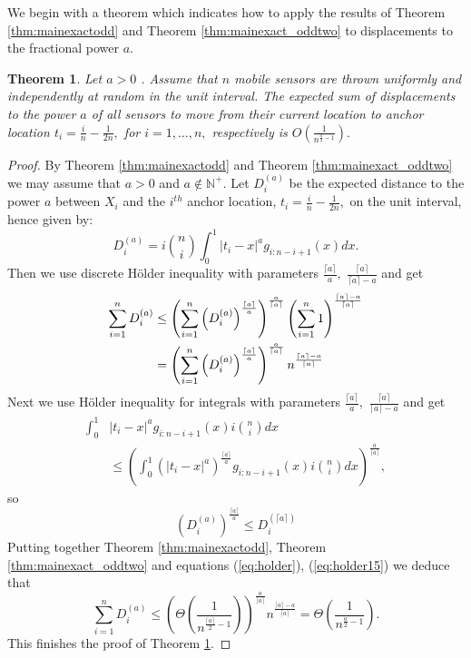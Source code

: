 \documentclass[final,5p,times,twocolumn]{elsarticle_mod}
\newtheorem{theorem}{Theorem}
\begin{document}
We begin with a theorem which indicates how to apply the results of 
Theorem \ref{thm:mainexactodd}  and Theorem \ref{thm:mainexact_oddtwo}
to displacements to the fractional power $a$.
\begin{theorem}
 \label{thm:fractional}
Let $a>0$ . Assume that $n$ mobile sensors are thrown uniformly and independently at random in the unit interval. The expected sum
of displacements to the power $a$ of all sensors to move from their current location to anchor location $t_i=\frac{i}{n}-\frac{1}{2n},$
for $i=1,\dots,n,$ respectively is $O\left(\frac{1}{n^{\frac{a}{2}-1}}\right).$
\end{theorem}
\begin{proof}
By Theorem \ref{thm:mainexactodd} and Theorem \ref{thm:mainexact_oddtwo} we may assume that $a>0$ and $a\notin \mathbb{N}^{+}.$
Let $D^{(a)}_i$ be the expected distance to the power $a$ between $X_i$ and the $i^{th}$ anchor location, $t_i=\frac{i}{n}-\frac{1}{2n},$ on the
unit interval, hence given by:
$$
D^{(a)}_i=i\binom{n}{i}\int_{0}^{1}|t_i-x|^ag_{i:n-i+1}(x)dx.
$$
Then we use discrete H\"older inequality with parameters $\frac{\lceil a\rceil}{a},$  $\frac{\lceil a\rceil}{\lceil a\rceil-a}$
and get
\begin{align}
 \notag
\sum_{i=1}^{n}D^{(a)}_i
&\le
\left(\sum_{i=1}^{n}\left(D^{(a)}_i\right)^{\frac{\lceil a\rceil}{a}}\right)^{\frac{a}{\lceil a \rceil}}
\left(\sum_{i=1}^{n}1\right)^{\frac{\lceil a\rceil-a}{\lceil a\rceil}}\\
&=  \label{eq:holder}
\left(\sum_{i=1}^{n}\left(D^{(a)}_i\right)^{\frac{\lceil a\rceil}{a}}\right)^{\frac{a}{\lceil a \rceil}}
n^{\frac{\lceil a\rceil-a}{\lceil a\rceil}}
\end{align}
Next we use H\"older inequality for integrals with parameters $\frac{\lceil a\rceil}{a},$  $\frac{\lceil a\rceil}{\lceil a\rceil-a}$ and get
\begin{align*}
\int_0^1&|t_i-x|^ag_{i:n-i+1}(x)i\binom{n}{i}dx\\
&\le
\left(\int_0^1\left(|t_i-x|^a\right)^{\frac{\lceil a \rceil}{a}}g_{i:n-i+1}(x)i\binom{n}{i}dx\right)^{\frac{a}{\lceil a\rceil}},
\end{align*}
so 
\begin{equation}
 \label{eq:holder15}
\left(D^{(a)}_i\right)^{\frac{\lceil a\rceil}{a}}\le D^{(\lceil a\rceil)}_i
\end{equation}
Putting together Theorem \ref{thm:mainexactodd}, Theorem \ref{thm:mainexact_oddtwo}
and equations (\ref{eq:holder}), (\ref{eq:holder15}) we deduce that
$$
\sum_{i=1}^{n}D^{(a)}_i\le\left(\Theta\left(\frac{1}{n^{\frac{\lceil a \rceil}{2}-1}}\right)\right)^{\frac{a}{\lceil a \rceil}}
n^{\frac{\lceil a\rceil-a}{\lceil a\rceil}}=\Theta\left(\frac{1}{n^{\frac{a }{2}-1}}\right).
$$
This finishes the proof of Theorem \ref{thm:fractional}. 
\end{proof}
\end{document}
